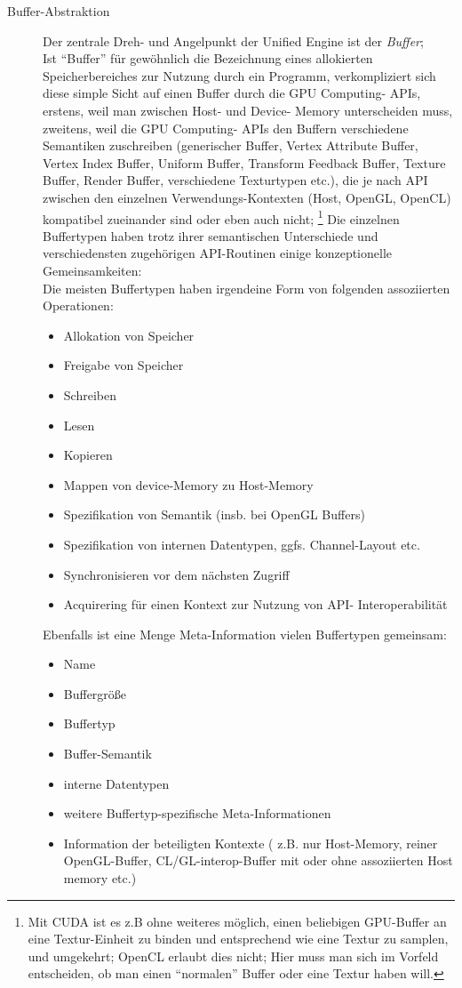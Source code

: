 \begin{description}
	\item[Buffer-Abstraktion]
	\label{overview:bufferAbstraction}
	Der zentrale Dreh- und Angelpunkt der Unified Engine ist der \emph{Buffer};\\
	Ist "`Buffer"' für gewöhnlich die Bezeichnung eines allokierten Speicherbereiches zur Nutzung durch ein Programm,
	verkompliziert sich diese simple Sicht auf einen Buffer durch die GPU Computing- APIs, erstens, weil man zwischen
	Host- und Device- Memory unterscheiden muss, zweitens, weil die GPU Computing- APIs den Buffern verschiedene Semantiken
	zuschreiben (generischer Buffer, Vertex Attribute Buffer, Vertex Index Buffer, Uniform Buffer, 
	Transform Feedback Buffer, Texture Buffer, Render Buffer, verschiedene Texturtypen etc.), 
	die je nach API zwischen den einzelnen Verwendungs-Kontexten (Host, OpenGL, OpenCL) 
	kompatibel zueinander sind oder eben auch nicht;
	\footnote{Mit CUDA ist es z.B ohne weiteres möglich, einen beliebigen GPU-Buffer an eine Textur-Einheit zu binden und 	
	entsprechend wie eine Textur zu samplen, und umgekehrt; OpenCL erlaubt dies nicht; Hier muss man sich im Vorfeld 
	entscheiden, ob man einen "`normalen"' Buffer oder eine Textur haben will.}
	Die einzelnen Buffertypen haben trotz ihrer semantischen Unterschiede und verschiedensten zugehörigen API-Routinen
	einige konzeptionelle Gemeinsamkeiten:\\
	Die meisten Buffertypen haben irgendeine Form von folgenden assoziierten Operationen:
	\begin{itemize}
		\item Allokation von Speicher
		\item Freigabe von Speicher
		\item Schreiben
		\item Lesen
		\item Kopieren
		\item Mappen von device-Memory zu Host-Memory
		\item Spezifikation von Semantik (insb. bei OpenGL Buffers)
		\item Spezifikation von internen Datentypen, ggfs. Channel-Layout etc.
		\item Synchronisieren vor dem nächsten Zugriff
		\item Acquirering für einen Kontext zur Nutzung von API- Interoperabilität	
	\end{itemize}
	Ebenfalls ist eine Menge Meta-Information vielen Buffertypen gemeinsam:
	\begin{itemize}
		\item Name
		\item Buffergröße
		\item Buffertyp
		\item Buffer-Semantik
		\item interne Datentypen
		\item weitere Buffertyp-spezifische Meta-Informationen
		\item Information der beteiligten Kontexte ( z.B. nur Host-Memory, reiner OpenGL-Buffer, 
				CL/GL-interop-Buffer mit oder ohne assoziierten Host memory etc.)
	\end{itemize}
	

\end{description}
